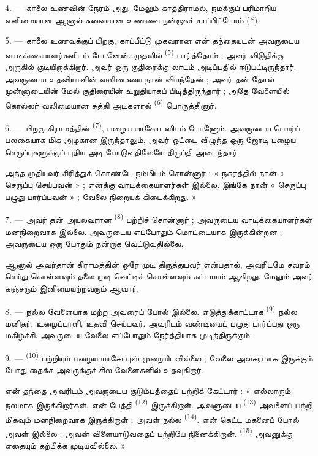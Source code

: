 4. --- காலை உணவின் நேரம் அது. மேலும் காத்திராமல், நமக்குப் பரிமாறிய
எளிமையான ஆனால் சுவையான உணவை நன்றாகச் சாப்பிட்டோம் (*).

\VUsaut{3.0mm}

5. --- காலை உணவுக்குப் பிறகு, காப்பீட்டு முகவரான என் தந்தையுடன் அவருடைய
வாடிக்கையாளர்களிடம் போனேன். முதலில் 
\textsuperscript{(5)} பார்த்தோம் ; அவர் விடுதிக்கு அருகில் குடியிருக்கிறார்.
அவர் ஒரு குதிரைக்கு லாடம் அடிப்பதில் ஈடுபட்டிருந்தார். அவருடைய உதவியாளின்
வலிமையை நான் வியந்தேன் ; அவர் தன் தோல் முன்னாடையின் மேல் குதிரையின்
 உறுதியாகப் பிடித்திருந்தார் ; அதே வேளையில் கொல்லர்
வலிமையான சுத்தி அடிகளால்  \textsuperscript{(6)}
பொருத்தினார்.

6. --- பிறகு கிராமத்தின் 
\textsuperscript{(7)}, பழைய யாகோபுஸிடம் போனோம். அவருடைய பெயர்ப் பலகையாக
மிக அழகான  இருந்தாலும், அவர் ஓட்டை விழுந்த ஒரு ஜோடி
பழைய செருப்புகளுக்குப் புதிய அடி போடுவதிலேயே திருப்தி அடைந்தார்.

அந்த முதியவர் சிரித்துக் கொண்டே நம்மிடம் சொன்னார் : « நகரத்தில் நான்
« செருப்பு செய்பவன் » ; எனக்கு வாடிக்கையாளர்கள் இல்லை. இங்கே நான்
« செருப்பு பழுது பார்ப்பவன் » ; வேலை நிறையக் கிடைக்கிறது. »

7. --- அவர் தன் அயலவரான  \textsuperscript{(8)}
பற்றிச் சொன்னார் ; அவருடைய வாடிக்கையாளர்கள் மனநிறைவாக இல்லை. அவருடைய
 எப்போதும் மொட்டையாக இருக்கின்றன ; அவருடைய
 ஒரு போதும் நன்றாக வெட்டுவதில்லை.

ஆனால் அவர்தான் கிராமத்தின் ஒரே முடி திருத்துபவர் என்பதால், அவரிடமே
சவரம் செய்து கொள்ளவும் தலை முடி வெட்டிக் கொள்ளவும் கட்டாயம் ஆகிறது.
மேலும் அவர் கஞ்சரும் இனிமையற்றவரும் ஆவார்.

8. --- நல்ல வேளையாக மற்ற  அவரைப் போல் இல்லை.
எடுத்துக்காட்டாக  \textsuperscript{(9)} நல்ல
மனிதர், உழைப்பாளி, உதவி செய்பவர். அவரிடம் வண்டியைப் பழுது பார்ப்பது
ஒரு மகிழ்ச்சி. அவருடைய வேலை எப்போதும் நேர்த்தியாக முடிந்திருக்கும்.

9. ---  \textsuperscript{(10)} பற்றியும் பழைய
யாகோபுஸ் முறையிடவில்லை ; வேலை அவசரமாக இருக்கும் போது
 தைக்க அவருக்குச் சில வேளைகளில் உதவுகிறார்.

என் தந்தை அவரிடம் அவருடைய குடும்பத்தைப் பற்றிக் கேட்டார் : « எல்லாரும்
நலமாக இருக்கிறார்கள். என் பேத்தி  \textsuperscript{(12)}
இருக்கிறாள். அவளுடைய  \textsuperscript{(13)} அவளைப் பற்றி
மிகவும் மனநிறைவாக இருக்கிறாள் ; அவள் நல்ல 
\textsuperscript{(14)}. என் கெட்ட மகனைப் போல் அவள் இல்லை ; அவன்
விளையாடுவதைப் பற்றியே நினைக்கிறான். 
\textsuperscript{(15)} அவனுக்கு எதையும் கற்பிக்க முடியவில்லை. »

